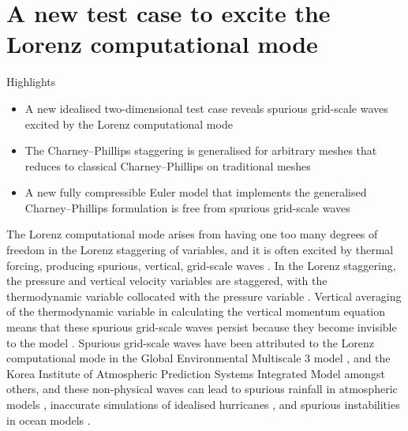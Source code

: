 \chapter{A new test case to excite the Lorenz computational mode}
\label{ch:cp}

\begin{highlights}
{\Large Highlights}
\begin{itemize}
	\item A new idealised two-dimensional test case reveals spurious grid-scale waves excited by the Lorenz computational mode
	\item The Charney--Phillips staggering is generalised for arbitrary meshes that reduces to classical Charney--Phillips on traditional meshes
	\item A new fully compressible Euler model that implements the generalised Charney--Phillips formulation is free from spurious grid-scale waves
\end{itemize}
\end{highlights}

The Lorenz computational mode arises from having one too many degrees of freedom in the Lorenz staggering of variables, and it is often excited by thermal forcing, producing spurious, vertical,  grid-scale waves \citep{schneider1987,arakawa-konor1996}.
In the Lorenz staggering, the pressure and vertical velocity variables are staggered, with the thermodynamic variable collocated with the pressure variable \citep{lorenz1960}.
Vertical averaging of the thermodynamic variable in calculating the vertical momentum equation means that these spurious grid-scale waves persist because they become invisible to the model \citep{arakawa-konor1996}.
Spurious grid-scale waves have been attributed to the Lorenz computational mode in the Global Environmental Multiscale 3 model \citep{girard2014}, and the Korea Institute of Atmospheric Prediction Systems Integrated Model \citep{yi-park2017} amongst others, and these non-physical waves can lead to spurious rainfall in atmospheric models \citep{hollingsworth1995}, inaccurate simulations of idealised hurricanes \citep{zhu-smith2003}, and spurious instabilities in ocean models \citep{bell-white2017}.

